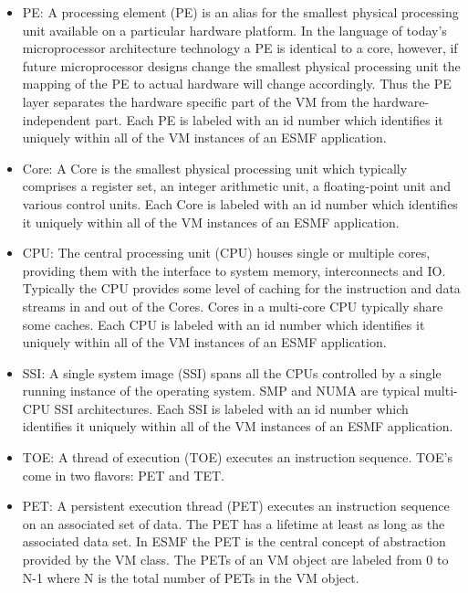 \begin{itemize}

\item PE: A processing element (PE) is an alias for the smallest physical processing unit available on a particular hardware platform. In the language of today's microprocessor architecture technology a PE is identical to a core, however, if future microprocessor designs change the smallest physical processing unit the mapping of the PE to actual hardware will change accordingly. Thus the PE layer separates the hardware specific part of the VM from the hardware-independent part. Each PE is labeled with an id number which identifies it uniquely within all of the VM instances of an ESMF application.

\item Core: A Core is the smallest physical processing unit which typically comprises a register set, an integer arithmetic unit, a floating-point unit and various control units. Each Core is labeled with an id number which identifies it uniquely within all of the VM instances of an ESMF application.

\item CPU: The central processing unit (CPU) houses single or multiple cores, providing them with the interface to system memory, interconnects and IO. Typically the CPU provides some level of caching for the instruction and data streams in and out of the Cores. Cores in a multi-core CPU typically share some caches. Each CPU is labeled with an id number which identifies it uniquely within all of the VM instances of an ESMF application.

\item SSI: A single system image (SSI) spans all the CPUs controlled by a single running instance of the operating system. SMP and NUMA are typical multi-CPU SSI architectures. Each SSI is labeled with an id number which identifies it uniquely within all of the VM instances of an ESMF application.

\item TOE: A thread of execution (TOE) executes an instruction sequence. TOE's come in two flavors: PET and TET.

\item PET: A persistent execution thread (PET) executes an instruction sequence on an associated set of data. The PET has a lifetime at least as long as the associated data set. In ESMF the PET is the central concept of abstraction provided by the VM class. The PETs of an VM object are labeled from 0 to N-1 where N is the total number of PETs in the VM object.


\end{itemize}
